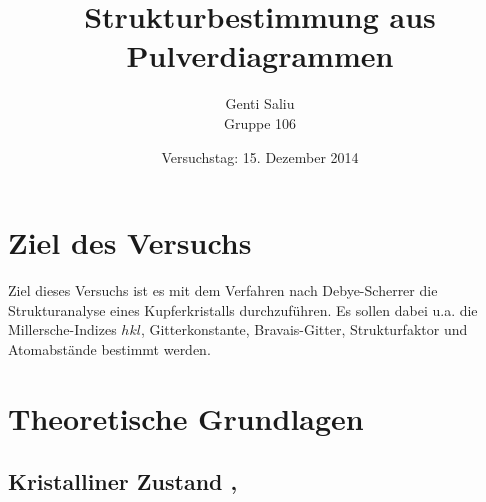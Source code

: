 \documentclass[a4paper,titlepage]{scrartcl}
\title{Strukturbestimmung aus Pulverdiagrammen}
\author{Genti Saliu\\Gruppe 106}
\date{Versuchstag: 15. Dezember 2014}
\numberwithin{equation}{section}
\begin{document}
	\begin{titlepage}
		\maketitle
		\thispagestyle{empty}
	\end{titlepage}
	
\newpage
{}
\tableofcontents

\newpage
{}

\section{Ziel des Versuchs}
Ziel dieses Versuchs ist es mit dem Verfahren nach Debye-Scherrer die Strukturanalyse eines Kupferkristalls durchzuführen. Es sollen dabei u.a. die Millersche-Indizes $hkl$, Gitterkonstante, Bravais-Gitter, Strukturfaktor und Atomabstände bestimmt werden.
\section{Theoretische Grundlagen}
\subsection{Kristalliner Zustand \cite{kittel}, \cite{wiki:kristallstruktur}}
\end{document}
